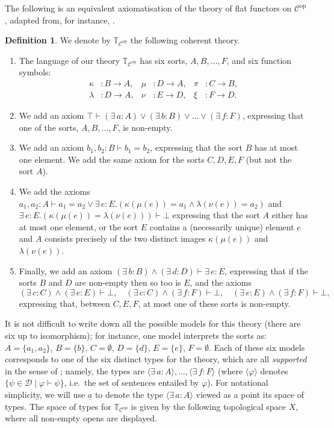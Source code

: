 \documentclass{article}
\theoremstyle{plain}
\theoremstyle{definition}
\newtheorem{df}[thm]{Definition}
\renewcommand{\phi}{\varphi}
\newcommand{\cat}{\mathcal{C}}
\newcommand{\dcat}{\mathcal{D}}
\newcommand{\theory}{\mathbb{T}}
\newcommand{\op}{^{\mathrm{op}}}
\begin{document}
	The following is an equivalent axiomatisation of the theory of flat functors on $\cat\op$, adapted from, for instance, \cite[Theorem 2.1.11]{TST}.
	\begin{df}\label{df:flat_functors}
		We denote by $\theory_{\cat\op}$ the following coherent theory.
		\begin{enumerate}
			\item The language of our theory $\theory_{\cat\op}$ has six sorts, $A, B, \dots , F$, and six function symbols:
			\begin{align*}
				\kappa & \colon B \to A , & \mu & \colon D \to A, & \pi & \colon C \to B , \\
				\lambda & \colon D \to A, & \nu & \colon E \to D,& \xi & \colon F \to D.
			\end{align*}
			\item We add an axiom $\top \vdash (\exists \, a : A )\lor (\exists \, b : B ) \lor \dots \lor (\exists \, f : F)$, expressing that one of the sorts, $A, B, \dots , F$, is non-empty.
			\item We add an axiom $b_1, b_2 : B \vdash b_1 = b_2$, expressing that the sort $B$ has at most one element.  We add the same axiom for the sorts $C, D, E, F$ (but not the sort $A$).
			\item We add the axioms $a_1, a_2 : A \vdash a_1 = a_2 \lor \exists\, e : E .(\kappa(\mu(e)) = a_1 \land \lambda(\nu(e)) = a_2)$ and $\exists\, e: E . (\kappa(\mu(e))=\lambda(\nu(e))) \vdash \bot$ expressing that the sort $A$ either has at most one element, or the sort $E$ contains a (necessarily unique) element $e$ and $A$ consists precisely of the two distinct images $\kappa(\mu(e))$ and $\lambda(\nu(e))$.
			\item Finally, we add an axiom $(\exists \, b : B) \land (\exists \, d : D) \vdash \exists \, e : E$, expressing that if the sorts $B$ and $D$ are non-empty then so too is $E$, and the axioms
			\[
			(\exists \, c : C)\land (\exists \, e : E) \vdash \bot, \quad (\exists\, c : C) \land (\exists \, f : F) \vdash \bot, \quad (\exists \, e : E) \land (\exists \, f : F) \vdash \bot,
			\]
			expressing that, between $C, E, F$, at most one of these sorts is non-empty.
		\end{enumerate}
	\end{df}
	It is not difficult to write down all the possible models for this theory (there are six up to isomorphism); for instance, one model interprets the sorts as: $A = \{a_1,a_2\}$, $B=\{b\}$, $C=\emptyset$, $D=\{d\}$, $E=\{e\}$, $F = \emptyset$.  Each of these six models corresponds to one of the six distinct types for the theory, which are all \emph{supported} in the sense of \cite[Definition 3.1.2]{kamsma_txtbk}; namely, the types are $\langle \exists\, a : A \rangle, \dots , \langle \exists\, f : F \rangle $ (where $\langle \phi \rangle $ denotes $ \{ \psi \in \dcat \mid \phi \vdash \psi \}$, i.e.\ the set of sentences entailed by $\phi$).  For notational simplicity, we will use $\underline{a}$ to denote the type $\langle \exists \, a : A\rangle$ viewed as a point its space of types.  The space of types for $\theory_{\cat\op}$ is given by the following topological space $X$, where all non-empty opens are displayed.
\end{document}
